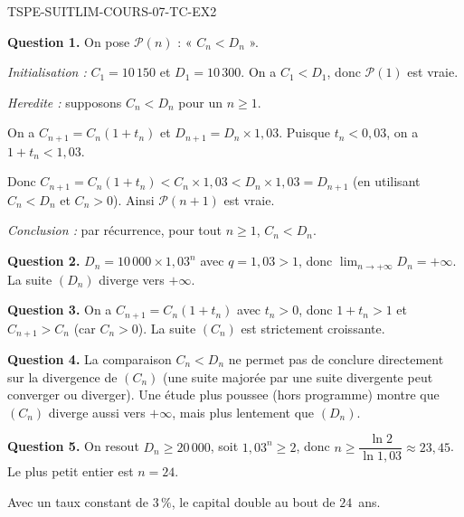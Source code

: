 \begin{corrige}{TSPE-SUITLIM-COURS-07-TC-EX2}


\textbf{Question 1.} On pose $\mathcal{P}(n)$ : « $C_n < D_n$ ».

\textit{Initialisation :} $C_1 = 10\,150$ et $D_1 = 10\,300$. On a $C_1 < D_1$, donc $\mathcal{P}(1)$ est vraie.

\textit{Heredite :} supposons $C_n < D_n$ pour un $n \geq 1$.

On a $C_{n+1} = C_n(1 + t_n)$ et $D_{n+1} = D_n \times 1{,}03$. Puisque $t_n < 0{,}03$, on a $1 + t_n < 1{,}03$.

Donc $C_{n+1} = C_n(1 + t_n) < C_n \times 1{,}03 < D_n \times 1{,}03 = D_{n+1}$ (en utilisant $C_n < D_n$ et $C_n > 0$). Ainsi $\mathcal{P}(n+1)$ est vraie.

\textit{Conclusion :} par récurrence, pour tout $n \geq 1$, $C_n < D_n$.

\textbf{Question 2.} $D_n = 10\,000 \times 1{,}03^n$ avec $q = 1{,}03 > 1$, donc $\lim_{n \to +\infty} D_n = +\infty$. La suite $(D_n)$ diverge vers $+\infty$.

\textbf{Question 3.} On a $C_{n+1} = C_n(1 + t_n)$ avec $t_n > 0$, donc $1 + t_n > 1$ et $C_{n+1} > C_n$ (car $C_n > 0$). La suite $(C_n)$ est strictement croissante.

\textbf{Question 4.} La comparaison $C_n < D_n$ ne permet pas de conclure directement sur la divergence de $(C_n)$ (une suite majorée par une suite divergente peut converger ou diverger). Une étude plus poussee (hors programme) montre que $(C_n)$ diverge aussi vers $+\infty$, mais plus lentement que $(D_n)$.

\textbf{Question 5.} On resout $D_n \geq 20\,000$, soit $1{,}03^n \geq 2$, donc $n \geq \dfrac{\ln 2}{\ln 1{,}03} \approx 23{,}45$. Le plus petit entier est $n = 24$.

Avec un taux constant de $3\,\%$, le capital double au bout de $24$~ans.

\end{corrige}
